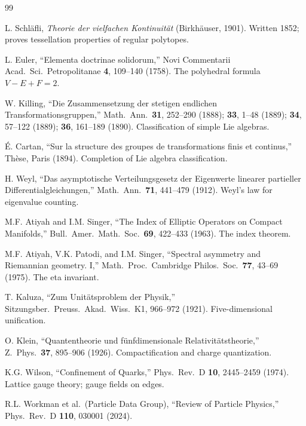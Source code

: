 \documentclass[11pt,a4paper]{article}
\theoremstyle{plain}
\theoremstyle{definition}
\theoremstyle{remark}
\begin{document}
\begin{thebibliography}{99}

 L. Schl\"afli, \emph{Theorie der vielfachen Kontinuit\"at} (Birkh\"auser, 1901). Written 1852; proves tessellation properties of regular polytopes.

 L. Euler, ``Elementa doctrinae solidorum,'' Novi Commentarii Acad.\ Sci.\ Petropolitanae \textbf{4}, 109--140 (1758). The polyhedral formula $V - E + F = 2$.

 W. Killing, ``Die Zusammensetzung der stetigen endlichen Transformationsgruppen,'' Math.\ Ann.\ \textbf{31}, 252--290 (1888); \textbf{33}, 1--48 (1889); \textbf{34}, 57--122 (1889); \textbf{36}, 161--189 (1890). Classification of simple Lie algebras.

 \'E. Cartan, ``Sur la structure des groupes de transformations finis et continus,'' Th\`ese, Paris (1894). Completion of Lie algebra classification.

 H. Weyl, ``Das asymptotische Verteilungsgesetz der Eigenwerte linearer partieller Differentialgleichungen,'' Math.\ Ann.\ \textbf{71}, 441--479 (1912). Weyl's law for eigenvalue counting.

 M.F. Atiyah and I.M. Singer, ``The Index of Elliptic Operators on Compact Manifolds,'' Bull.\ Amer.\ Math.\ Soc.\ \textbf{69}, 422--433 (1963). The index theorem.

 M.F. Atiyah, V.K. Patodi, and I.M. Singer, ``Spectral asymmetry and Riemannian geometry. I,'' Math.\ Proc.\ Cambridge Philos.\ Soc.\ \textbf{77}, 43--69 (1975). The eta invariant.

 T. Kaluza, ``Zum Unit\"atsproblem der Physik,'' Sitzungsber.\ Preuss.\ Akad.\ Wiss.\ K1, 966--972 (1921). Five-dimensional unification.

 O. Klein, ``Quantentheorie und f\"unfdimensionale Relativit\"atstheorie,'' Z.\ Phys.\ \textbf{37}, 895--906 (1926). Compactification and charge quantization.

 K.G. Wilson, ``Confinement of Quarks,'' Phys.\ Rev.\ D \textbf{10}, 2445--2459 (1974). Lattice gauge theory; gauge fields on edges.

 R.L. Workman et al.\ (Particle Data Group), ``Review of Particle Physics,'' Phys.\ Rev.\ D \textbf{110}, 030001 (2024).


\end{thebibliography}
\end{document}
